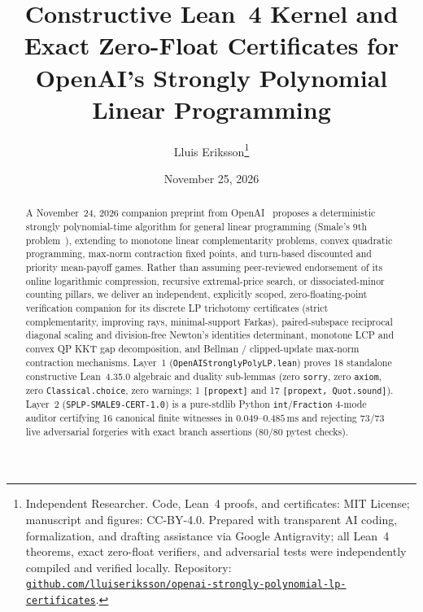 \documentclass[10pt,twocolumn]{article}
\title{\vspace{-0.9em}\textbf{Constructive Lean~4 Kernel and Exact Zero-Float Certificates for OpenAI's Strongly Polynomial Linear Programming}}
\author{Lluis Eriksson\thanks{Independent Researcher. Code, Lean~4 proofs, and certificates: MIT License; manuscript and figures: CC-BY-4.0. Prepared with transparent AI coding, formalization, and drafting assistance via Google Antigravity; all Lean~4 theorems, exact zero-float verifiers, and adversarial tests were independently compiled and verified locally. Repository: \href{https://github.com/lluiseriksson/openai-strongly-polynomial-lp-certificates}{\texttt{github.com/lluiseriksson/\allowbreak openai-strongly-\allowbreak polynomial-lp-certificates}}.}}
\date{November 25, 2026}
\begin{document}
\maketitle
\vspace{-1.2em}

\begin{abstract}
A November~24, 2026 companion preprint from OpenAI~\cite{openai2026splp} proposes a deterministic strongly polynomial-time algorithm for general linear programming (Smale's 9th problem~\cite{smale1998mathematical}), extending to monotone linear complementarity problems, convex quadratic programming, max-norm contraction fixed points, and turn-based discounted and priority mean-payoff games. Rather than assuming peer-reviewed endorsement of its online logarithmic compression, recursive extremal-price search, or dissociated-minor counting pillars, we deliver an independent, explicitly scoped, zero-floating-point verification companion for its discrete LP trichotomy certificates (strict complementarity, improving rays, minimal-support Farkas), paired-subspace reciprocal diagonal scaling and division-free Newton's identities determinant, monotone LCP and convex QP KKT gap decomposition, and Bellman / clipped-update max-norm contraction mechanisms. Layer~1 (\texttt{OpenAI\allowbreak StronglyPolyLP.lean}) proves 18 standalone constructive Lean~4.35.0 algebraic and duality sub-lemmas (zero \texttt{sorry}, zero \texttt{axiom}, zero \texttt{Classical.choice}, zero warnings; 1 \texttt{[propext]} and 17 \texttt{[propext, Quot.sound]}). Layer~2 (\texttt{SPLP-SMALE9-CERT-1.0}) is a pure-stdlib Python \texttt{int}/\texttt{Fraction} 4-mode auditor certifying 16 canonical finite witnesses in $0.049$--$0.485\,\mathrm{ms}$ and rejecting 73/73 live adversarial forgeries with exact branch assertions (80/80 pytest checks).
\end{abstract}
\end{document}
